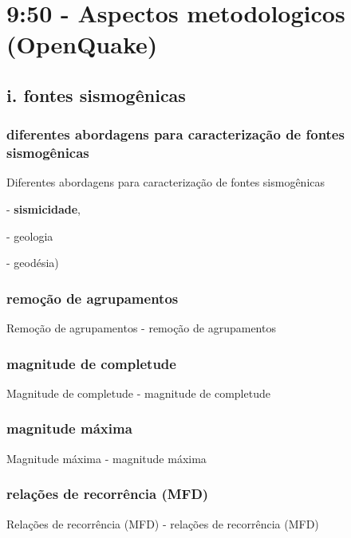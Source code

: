\documentclass[ucs,8pt]{beamer}
\begin{document}
\section{9:50 - Aspectos metodologicos (OpenQuake)}

	\subsection{i. fontes sismogênicas} 

		\subsubsection{diferentes abordagens para caracterização de fontes sismogênicas}
		\begin{frame}{Diferentes abordagens para caracterização de fontes sismogênicas}
			
			- \textbf{sismicidade}, 
			
			- geologia 
			
			- geodésia)
		\end{frame}

		\subsubsection{remoção de agrupamentos}
		\begin{frame}{Remoção de agrupamentos}
			- remoção de agrupamentos
		\end{frame}

		\subsubsection{magnitude de completude}
		\begin{frame}{Magnitude de completude}
			- magnitude de completude
		\end{frame}

		\subsubsection{magnitude máxima}
		\begin{frame}{Magnitude máxima}
			- magnitude máxima
		\end{frame}

		\subsubsection{relações de recorrência (MFD)}
		\begin{frame}{Relações de recorrência (MFD)}
			- relações de recorrência (MFD)
		\end{frame}
\end{document}
